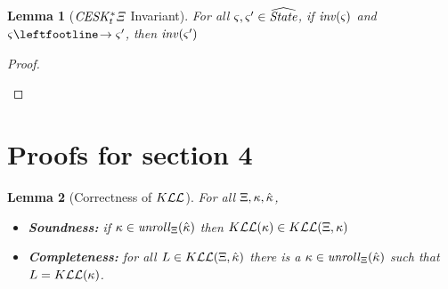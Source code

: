 \documentclass{article}
\newtheorem{lemma}{Lemma}
\begin{document}
\begin{lemma}[$\mathit{CESK^*_t\Xi}$ Invariant]\label{lem:invariant}
  For all $\varsigma,\varsigma' \in \widehat{\mathit{State}}$, if $\mathit{inv}(\varsigma)$ and $\mstate \stepto \mstate'$, then $\mathit{inv}(\varsigma')$
\end{lemma}
\begin{proof}
      \begin{byCases}



      \end{byCases}
\end{proof}

\section{Proofs for section 4}

\begin{lemma}[Correctness of $K{\mathcal L}{\mathcal L}$]
  For all $\Xi,\kappa,\hat{\kappa}$,
  \begin{itemize}
  \item{\textbf{Soundness:} if $\kappa \in \mathit{unroll}_{\Xi}(\hat{\kappa})$ then $K{\mathcal L}{\mathcal L}(\kappa) \in K{\mathcal L}{\mathcal L}(\Xi,\kappa)$}
  \item{\textbf{Completeness:} for all $L \in K{\mathcal L}{\mathcal L}(\Xi,\hat{\kappa})$ there is a $\kappa \in \mathit{unroll}_{\Xi}(\hat{\kappa})$ such that $L = K{\mathcal L}{\mathcal L}(\kappa)$.}
  \end{itemize}
\end{lemma}
\end{document}
